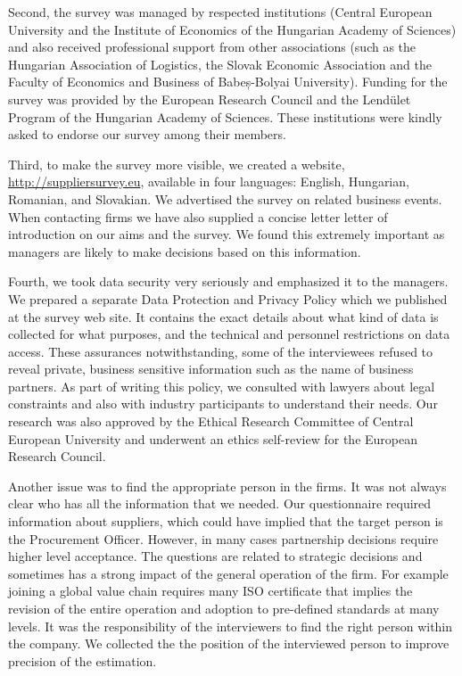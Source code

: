 \documentclass[final, dvipsnames, authoryear,12pt]{elsarticle}
\begin{document}
Second, the survey was managed by respected institutions (Central European University and the Institute of Economics of the Hungarian Academy of Sciences) and also received professional support from other associations (such as the Hungarian Association of Logistics, the Slovak Economic Association and the Faculty of Economics and Business of Babeș-Bolyai University). Funding for the survey was provided by the European Research Council and the Lendület Program of the Hungarian Academy of Sciences. These institutions were kindly asked to endorse our survey among their members.

Third, to make the survey more visible, we created a website, \url{http://suppliersurvey.eu}, available in four languages: English, Hungarian, Romanian, and Slovakian. We advertised the survey on related business events.
When contacting firms we have also supplied a concise letter letter of introduction on our aims and the survey. We found this extremely important as managers are likely to make decisions based on this information.

Fourth, we took data security very seriously and emphasized it to the managers. We prepared a separate Data Protection and Privacy Policy which we published at the survey web site.  It contains the exact details about what kind of data is collected for what purposes, and the technical and personnel restrictions on data access. These assurances notwithstanding, some of the interviewees refused to reveal private, business sensitive information such as the name of business partners. As part of writing this policy, we consulted with lawyers about legal constraints and also with industry participants to understand their needs. Our research was also approved by the Ethical Research Committee of Central European University and underwent an ethics self-review for the European Research Council.   

Another issue was to find the appropriate person in the firms. It was not always clear who has all the information that we needed. Our questionnaire required information about suppliers, which could have implied that the target person is the Procurement Officer. However, in many cases partnership decisions require higher level acceptance. The questions are related to strategic decisions and sometimes has a strong impact of the general operation of the firm. For example joining a global value chain requires many ISO certificate that implies the revision of the entire operation and adoption to pre-defined standards at many levels. It was the responsibility of the interviewers to find the right person within the company. We collected the the position of the interviewed person to improve precision of the estimation.
\end{document}
